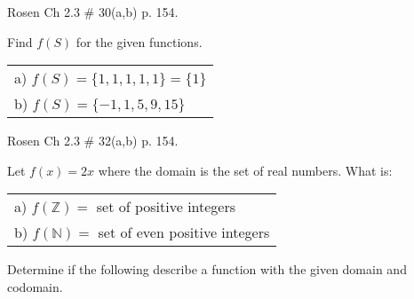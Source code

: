 \documentclass[11pt]{exam}
\newcommand{\ra}{\rightarrow}
\newcommand{\N}{\mathbb{N}}
\newcommand{\Z}{\mathbb{Z}}
\newcommand{\R}{\mathbb{R}}
\begin{document}
\begin{questions}
\question[6] Rosen Ch 2.3 \# 30(a,b) p. 154.
\begin{solution}
Find $f(S)$ for the given functions.

\begin{tabular}{l}
  a) $f(S) = \{ 1, 1, 1, 1, 1 \} = \{ 1 \}$ \\
  b) $f(S) = \{ -1, 1, 5, 9, 15 \}$ \\
\end{tabular}
\end{solution}


\question[4] Rosen Ch 2.3 \# 32(a,b) p. 154.
\begin{solution}
Let $f(x) = 2x$ where the domain is the set of real numbers. What is:

\begin{tabular}{l}
  a) $f(\Z) =$ set of positive integers \\
  b) $f(\N) =$ set of even positive integers \\
\end{tabular}
\end{solution}

\question[6] Determine if the following describe a function with the given domain and codomain.
\begin{solution}
\end{solution}
\end{questions}
\end{document}
